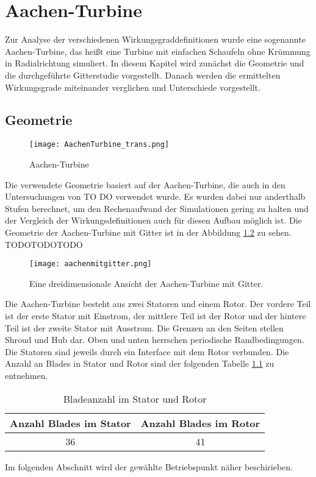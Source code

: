 \chapter{Aachen-Turbine}
\label{cha:aachen}
Zur Analyse der verschiedenen Wirkungsgraddefinitionen wurde eine sogenannte Aachen-Turbine, das heißt eine Turbine mit einfachen Schaufeln ohne Krümmung in Radialrichtung simuliert. In diesem Kapitel wird zunächst die Geometrie und die durchgeführte Gitterstudie vorgestellt. Danach werden die ermittelten Wirkungsgrade miteinander verglichen und Unterschiede vorgestellt.
\section{Geometrie}
\label{sec:aachengeo}
  \begin{figure}[htbp]
	\centering
	\label{fig:imgAachenTurbine}
	\texttt{[image: AachenTurbine\_trans.png]}
	\caption{Aachen-Turbine}
\end{figure} 
Die verwendete Geometrie basiert auf der Aachen-Turbine, die auch in den Untersuchungen von TO DO verwendet wurde. Es wurden dabei nur anderthalb Stufen berechnet, um den Rechenaufwand der Simulationen gering zu halten und der Vergleich der Wirkungsdefinitionen auch für diesen Aufbau möglich ist. Die Geometrie der Aachen-Turbine mit Gitter ist in der Abbildung \ref{fig:aachengebiet} zu sehen. TODOTODOTODO
\begin{figure}[H]
\texttt{[image: aachenmitgitter.png]}
\caption{Eine dreidimensionale Ansicht der Aachen-Turbine mit Gitter.}
\label{fig:aachengebiet}
\end{figure}
Die Aachen-Turbine besteht aus zwei Statoren und einem Rotor. Der vordere Teil ist der erste Stator mit Einstrom, der mittlere Teil ist der Rotor und der hintere Teil ist der zweite Stator mit Ausstrom. Die Grenzen an den Seiten stellen Shroud und Hub dar. Oben und unten herrschen periodische Randbedingungen. Die Statoren sind jeweils durch ein Interface mit dem Rotor verbunden. Die Anzahl an Blades in Stator und Rotor sind der folgenden Tabelle \ref{tab:aachenabmessungen} zu entnehmen.
\begin{table}[H]
\centering
\label{tab:aachenabmessungen}
\caption{Bladeanzahl im Stator und Rotor}
\begin{tabular}{ c| c}
Anzahl Blades im Stator&Anzahl Blades im Rotor\\
\hline
36&41\\
\end{tabular}
\end{table}
Im folgenden Abschnitt wird der gewählte Betriebspunkt näher beschirieben.
